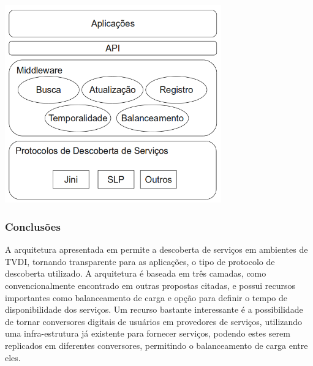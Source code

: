 \begin{center}
	\includegraphics[width=0.70\textwidth]{images/arquitetura-descoberta-servicos-tvdi.png}
	\label{fig:arq-descoberta-servicos-tvdi}
\end{center}

\subsubsection{Conclusões}

A arquitetura apresentada em \cite{borges2007arquitetura} permite a descoberta de serviços em ambientes de TVDI, tornando transparente para as aplicações, o tipo de protocolo de descoberta utilizado. A arquitetura é baseada em três camadas, como convencionalmente encontrado em outras propostas citadas, e possui recursos importantes como balanceamento de carga e opção para definir o tempo de disponibilidade dos serviços. Um recurso bastante interessante é a possibilidade de tornar conversores digitais de usuários em provedores de serviços, utilizando uma infra-estrutura já existente para fornecer serviços, podendo estes serem replicados em diferentes conversores, permitindo o balanceamento de carga entre eles.
